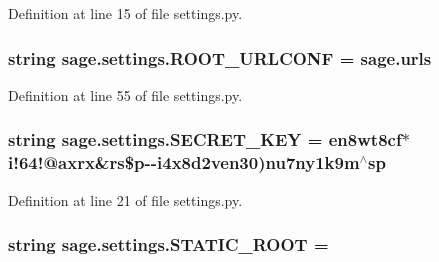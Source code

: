 Definition at line 15 of file settings.\+py.

\hypertarget{namespacesage_1_1settings_a92b3d804acae3871a9877ad143df4201}{}
\subsubsection[{R\+O\+O\+T\+\_\+\+U\+R\+L\+C\+O\+N\+F}]{\setlength{\rightskip}{0pt plus 5cm}string sage.\+settings.\+R\+O\+O\+T\+\_\+\+U\+R\+L\+C\+O\+N\+F = \textquotesingle{}sage.\+urls\textquotesingle{}}\label{namespacesage_1_1settings_a92b3d804acae3871a9877ad143df4201}


Definition at line 55 of file settings.\+py.

\hypertarget{namespacesage_1_1settings_acc7cb44e3d92fc1334c19318ede49bc8}{}
\subsubsection[{S\+E\+C\+R\+E\+T\+\_\+\+K\+E\+Y}]{\setlength{\rightskip}{0pt plus 5cm}string sage.\+settings.\+S\+E\+C\+R\+E\+T\+\_\+\+K\+E\+Y = \textquotesingle{}en8wt8cf$\ast$i!64!@axrx\&rs\$p-\/-\/i4x8d2ven30)nu7ny1k9m$^\wedge$sp\textquotesingle{}}\label{namespacesage_1_1settings_acc7cb44e3d92fc1334c19318ede49bc8}


Definition at line 21 of file settings.\+py.

\hypertarget{namespacesage_1_1settings_a91b967847aecdd4d0edfbb0229656929}{}
\subsubsection[{S\+T\+A\+T\+I\+C\+\_\+\+R\+O\+O\+T}]{\setlength{\rightskip}{0pt plus 5cm}string sage.\+settings.\+S\+T\+A\+T\+I\+C\+\_\+\+R\+O\+O\+T = \textquotesingle{}\textquotesingle{}}\label{namespacesage_1_1settings_a91b967847aecdd4d0edfbb0229656929}



